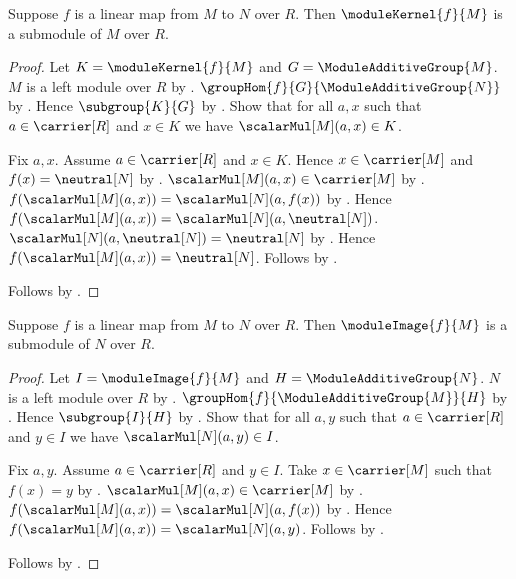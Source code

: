 \begin{theorem}\label{module_kernel_is_submodule}
    Suppose $f$ is a linear map from $M$ to $N$ over $R$.
    Then $\moduleKernel{f}{M}$ is a submodule of $M$ over $R$.
\end{theorem}
\begin{proof}
    Let $K=\moduleKernel{f}{M}$ and
        $G=\ModuleAdditiveGroup{M}$.
    $M$ is a left module over $R$ by
        .
    $\groupHom{f}{G}{\ModuleAdditiveGroup{N}}$ by
        .
    Hence $\subgroup{K}{G}$ by
        .
    Show that for all $a,x$ such that $a\in\carrier[R]$ and $x\in K$
        we have $\scalarMul[M](a,x)\in K$.
    \begin{subproof}
        Fix $a,x$.
        Assume $a\in\carrier[R]$ and $x\in K$.
        Hence $x\in\carrier[M]$ and $f(x)=\neutral[N]$ by
            .
        $\scalarMul[M](a,x)\in\carrier[M]$ by
            .
        $f(\scalarMul[M](a,x))=\scalarMul[N](a,f(x))$ by
            .
        Hence $f(\scalarMul[M](a,x))
            =\scalarMul[N](a,\neutral[N])$.
        $\scalarMul[N](a,\neutral[N])=\neutral[N]$ by
            .
        Hence $f(\scalarMul[M](a,x))=\neutral[N]$.
        Follows by .
    \end{subproof}
    Follows by .
\end{proof}

\begin{theorem}\label{module_image_is_submodule}
    Suppose $f$ is a linear map from $M$ to $N$ over $R$.
    Then $\moduleImage{f}{M}$ is a submodule of $N$ over $R$.
\end{theorem}
\begin{proof}
    Let $I=\moduleImage{f}{M}$ and
        $H=\ModuleAdditiveGroup{N}$.
    $N$ is a left module over $R$ by
        .
    $\groupHom{f}{\ModuleAdditiveGroup{M}}{H}$ by
        .
    Hence $\subgroup{I}{H}$ by
        .
    Show that for all $a,y$ such that $a\in\carrier[R]$ and $y\in I$
        we have $\scalarMul[N](a,y)\in I$.
    \begin{subproof}
        Fix $a,y$.
        Assume $a\in\carrier[R]$ and $y\in I$.
        Take $x\in\carrier[M]$ such that $f(x)=y$ by
            .
        $\scalarMul[M](a,x)\in\carrier[M]$ by
            .
        $f(\scalarMul[M](a,x))=\scalarMul[N](a,f(x))$ by
            .
        Hence $f(\scalarMul[M](a,x))=\scalarMul[N](a,y)$.
        Follows by .
    \end{subproof}
    Follows by .
\end{proof}

